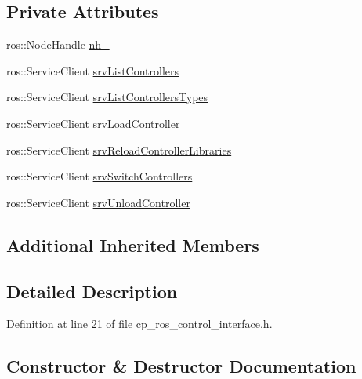 \subsection*{Private Attributes}
\begin{DoxyCompactItemize}
\item 
ros\+::\+Node\+Handle \hyperlink{classsmacc_1_1components_1_1CpRosControlInterface_a58b15bd11d13cb02813232c6e50adbd2}{nh\+\_\+}
\item 
ros\+::\+Service\+Client \hyperlink{classsmacc_1_1components_1_1CpRosControlInterface_aec2d2eb63ad4f04741493329e6c33696}{srv\+List\+Controllers}
\item 
ros\+::\+Service\+Client \hyperlink{classsmacc_1_1components_1_1CpRosControlInterface_a5a4983fca48da646b5fc94ce1f0e4114}{srv\+List\+Controllers\+Types}
\item 
ros\+::\+Service\+Client \hyperlink{classsmacc_1_1components_1_1CpRosControlInterface_aa6c1440534d6a825644f0c3620461b72}{srv\+Load\+Controller}
\item 
ros\+::\+Service\+Client \hyperlink{classsmacc_1_1components_1_1CpRosControlInterface_afdfece75d6aa438fae728e72add50e16}{srv\+Reload\+Controller\+Libraries}
\item 
ros\+::\+Service\+Client \hyperlink{classsmacc_1_1components_1_1CpRosControlInterface_a78e45e68567c23ca5c19df0de257c20f}{srv\+Switch\+Controllers}
\item 
ros\+::\+Service\+Client \hyperlink{classsmacc_1_1components_1_1CpRosControlInterface_a0515a2a86bfcd0fdec08fabd3070723c}{srv\+Unload\+Controller}
\end{DoxyCompactItemize}
\subsection*{Additional Inherited Members}


\subsection{Detailed Description}


Definition at line 21 of file cp\+\_\+ros\+\_\+control\+\_\+interface.\+h.



\subsection{Constructor \& Destructor Documentation}
